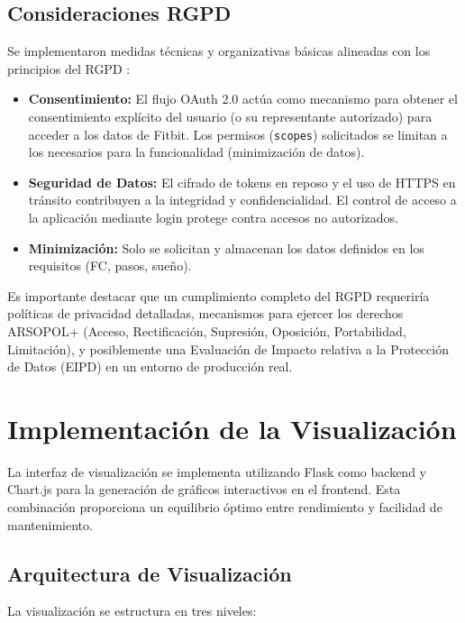 \subsection{Consideraciones RGPD}
Se implementaron medidas técnicas y organizativas básicas alineadas con los principios del RGPD \citep{aepd_principios_rgpd}:
\begin{itemize}
    \item \textbf{Consentimiento:} El flujo OAuth 2.0 actúa como mecanismo para obtener el consentimiento explícito del usuario (o su representante autorizado) para acceder a los datos de Fitbit. Los permisos (\texttt{scopes}) solicitados se limitan a los necesarios para la funcionalidad (minimización de datos).
    \item \textbf{Seguridad de Datos:} El cifrado de tokens en reposo y el uso de HTTPS en tránsito contribuyen a la integridad y confidencialidad. El control de acceso a la aplicación mediante login protege contra accesos no autorizados.
    \item \textbf{Minimización:} Solo se solicitan y almacenan los datos definidos en los requisitos (FC, pasos, sueño).
\end{itemize}
Es importante destacar que un cumplimiento completo del RGPD requeriría políticas de privacidad detalladas, mecanismos para ejercer los derechos ARSOPOL+ (Acceso, Rectificación, Supresión, Oposición, Portabilidad, Limitación), y posiblemente una Evaluación de Impacto relativa a la Protección de Datos (EIPD) en un entorno de producción real.

\section{Implementación de la Visualización}
\label{sec:impl_visualizacion}

La interfaz de visualización se implementa utilizando Flask como backend y Chart.js para la generación de gráficos interactivos en el frontend. Esta combinación proporciona un equilibrio óptimo entre rendimiento y facilidad de mantenimiento.

\subsection{Arquitectura de Visualización}
La visualización se estructura en tres niveles:


